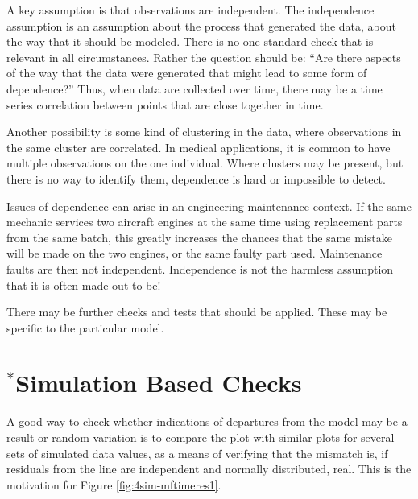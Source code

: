  A key assumption is that observations are independent.  The
 independence assumption is an assumption about the process that
 generated the data, about the way that it should be modeled.
 There is no one standard check that is relevant in all circumstances.
 Rather the question should be: ``Are there aspects of the way that
 the data were generated that might lead to some form of dependence?''
 Thus, when data are collected over time, there may be a time series
 correlation between points that are close together in time.

 Another possibility is some kind of clustering in the data, where
 observations in the same cluster are correlated. In medical
 applications, it is common to have multiple observations on the one
 individual.   Where clusters may be present, but there is no way to
 identify them, dependence is hard or impossible to detect.

 Issues of dependence can arise in an engineering maintenance context.
 If the same mechanic services two aircraft engines at the same time
 using replacement parts from the same batch, this greatly increases
 the chances that the same mistake will be made on the two engines, or
 the same faulty part used.  Maintenance faults are then not
 independent. Independence is not the harmless assumption that it is
 often made out to be!

There may be further checks and tests that should be applied.
These may be specific to the particular model.

\section{$^*$Simulation Based Checks}\label{sec:simcheck}

A good way to check whether indications of departures from the model
may be a result or random variation is to compare the plot with
similar plots for several sets of simulated data values, as a means
of verifying that the mismatch is, if residuals from the line are
independent and normally distributed, real. This is the motivation
for Figure \ref{fig:4sim-mftimeres1}. 
  

